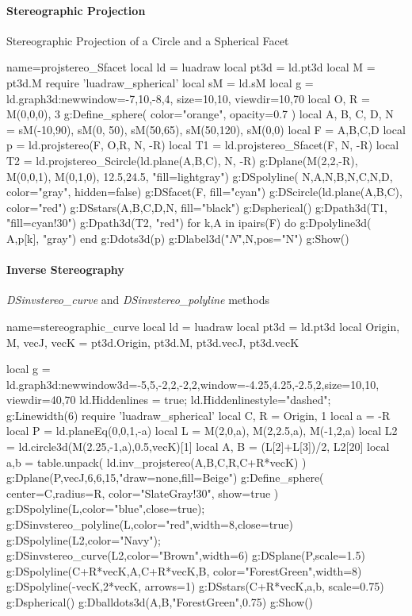 \paragraph{Stereographic Projection}

\begin{demo}{Stereographic Projection of a Circle and a Spherical Facet}
\begin{luadraw}{name=projstereo_Sfacet}
local ld = luadraw
local pt3d = ld.pt3d
local M = pt3d.M
require 'luadraw_spherical'
local sM = ld.sM
local g = ld.graph3d:new{window={-7,10,-8,4}, size={10,10}, viewdir={10,70}}
local O, R = M(0,0,0), 3
g:Define_sphere( {color="orange", opacity=0.7} )
local A, B, C, D, N = sM(-10,90), sM(0, 50), sM(50,65), sM(50,120), sM(0,0)
local F = {A,B,C,D}
local p = ld.projstereo(F, {O,R}, N, -R)
local T1 = ld.projstereo_Sfacet(F, N, -R)
local T2 = ld.projstereo_Scircle(ld.plane(A,B,C), N, -R)
g:Dplane({M(2,2,-R), M(0,0,1)}, M(0,1,0), 12.5,24.5, "fill=lightgray")
g:DSpolyline( {{N,A},{N,B},{N,C},{N,D}}, {color="gray", hidden=false})
g:DSfacet(F, {fill="cyan"})
g:DScircle(ld.plane(A,B,C), {color="red"})
g:DSstars({A,B,C,D,N}, {fill="black"})
g:Dspherical()
g:Dpath3d(T1, "fill=cyan!30")
g:Dpath3d(T2, "red")
for k,A in ipairs(F) do 
    g:Dpolyline3d( {A,p[k]}, "gray")
end
g:Ddots3d(p)
g:Dlabel3d("$N$",N,{pos="N"})
g:Show()
\end{luadraw}
\end{demo}


\paragraph{Inverse Stereography}

\begin{demo}{\emph{DSinvstereo\_curve} and \emph{DSinvstereo\_polyline} methods}
\begin{luadraw}{name=stereographic_curve}
local ld = luadraw
local pt3d = ld.pt3d
local Origin, M, vecJ, vecK = pt3d.Origin, pt3d.M, pt3d.vecJ, pt3d.vecK

local g = ld.graph3d:new{window3d={-5,5,-2,2,-2,2},window={-4.25,4.25,-2.5,2},size={10,10}, viewdir={40,70}}
ld.Hiddenlines = true; ld.Hiddenlinestyle="dashed"; g:Linewidth(6)
require 'luadraw_spherical'
local C, R = Origin, 1
local a = -R
local P = ld.planeEq(0,0,1,-a)
local L = {M(2,0,a), M(2,2.5,a), M(-1,2,a)}
local L2 = ld.circle3d(M(2.25,-1,a),0.5,vecK)[1]
local A, B = (L[2]+L[3])/2, L2[20]
local a,b = table.unpack( ld.inv_projstereo({A,B},{C,R},C+R*vecK) )
g:Dplane(P,vecJ,6,6,15,"draw=none,fill=Beige")
g:Define_sphere( {center=C,radius=R, color="SlateGray!30", show=true} )
g:DSpolyline(L,{color="blue",close=true}); g:DSinvstereo_polyline(L,{color="red",width=8,close=true})
g:DSpolyline(L2,{color="Navy"}); g:DSinvstereo_curve(L2,{color="Brown",width=6})
g:DSplane(P,{scale=1.5})
g:DSpolyline({{C+R*vecK,A},{C+R*vecK,B}}, {color="ForestGreen",width=8})
g:DSpolyline({{-vecK,2*vecK}}, {arrows=1})
g:DSstars({C+R*vecK,a,b}, {scale=0.75})
g:Dspherical()
g:Dballdots3d({A,B},"ForestGreen",0.75)
g:Show()
\end{luadraw}
\end{demo}

